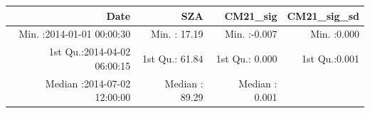 \documentclass[
  10pt,
  a4paper,oneside]{article}
\begin{document}
\begin{longtable}[]{@{}rrrr@{}}
\toprule
\begin{minipage}[b]{0.33\columnwidth}\raggedleft
Date\strut
\end{minipage} & \begin{minipage}[b]{0.19\columnwidth}\raggedleft
SZA\strut
\end{minipage} & \begin{minipage}[b]{0.19\columnwidth}\raggedleft
CM21\_sig\strut
\end{minipage} & \begin{minipage}[b]{0.19\columnwidth}\raggedleft
CM21\_sig\_sd\strut
\end{minipage}\tabularnewline
\midrule
\endhead
\begin{minipage}[t]{0.33\columnwidth}\raggedleft
Min. :2014-01-01 00:00:30\strut
\end{minipage} & \begin{minipage}[t]{0.19\columnwidth}\raggedleft
Min. : 17.19\strut
\end{minipage} & \begin{minipage}[t]{0.19\columnwidth}\raggedleft
Min. :-0.007\strut
\end{minipage} & \begin{minipage}[t]{0.19\columnwidth}\raggedleft
Min. :0.000\strut
\end{minipage}\tabularnewline
\begin{minipage}[t]{0.33\columnwidth}\raggedleft
1st Qu.:2014-04-02 06:00:15\strut
\end{minipage} & \begin{minipage}[t]{0.19\columnwidth}\raggedleft
1st Qu.: 61.84\strut
\end{minipage} & \begin{minipage}[t]{0.19\columnwidth}\raggedleft
1st Qu.: 0.000\strut
\end{minipage} & \begin{minipage}[t]{0.19\columnwidth}\raggedleft
1st Qu.:0.001\strut
\end{minipage}\tabularnewline
\begin{minipage}[t]{0.33\columnwidth}\raggedleft
Median :2014-07-02 12:00:00\strut
\end{minipage} & \begin{minipage}[t]{0.19\columnwidth}\raggedleft
Median : 89.29\strut
\end{minipage} & \begin{minipage}[t]{0.19\columnwidth}\raggedleft
Median : 0.001\strut
\end{minipage} & \begin{minipage}[t]{0.19\columnwidth}\raggedleft

\end{minipage}
\end{longtable}
\end{document}
